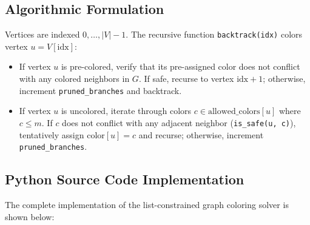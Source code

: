 \documentclass[12pt]{article}
\begin{document}
\subsection{Algorithmic Formulation}
Vertices are indexed $0, \dots, |V|-1$. The recursive function \texttt{backtrack(idx)} colors vertex $u = V[\text{idx}]$:
\begin{itemize}
    \item If vertex $u$ is pre-colored, verify that its pre-assigned color does not conflict with any colored neighbors in $G$. If safe, recurse to vertex $\text{idx}+1$; otherwise, increment \texttt{pruned\_branches} and backtrack.
    \item If vertex $u$ is uncolored, iterate through colors $c \in \text{allowed\_colors}[u]$ where $c \le m$. If $c$ does not conflict with any adjacent neighbor (\texttt{is\_safe(u, c)}), tentatively assign $\text{color}[u] = c$ and recurse; otherwise, increment \texttt{pruned\_branches}.
\end{itemize}

\subsection{Python Source Code Implementation}
The complete implementation of the list-constrained graph coloring solver is shown below:
\end{document}
